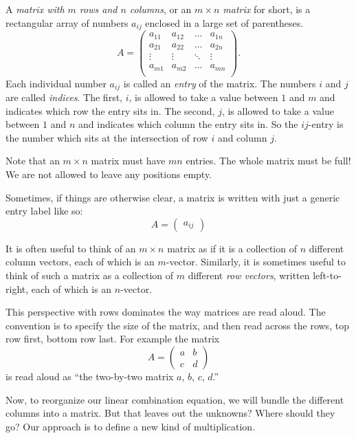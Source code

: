 \documentclass[00-livre-main.tex]{subfiles}
\begin{document}
\begin{definition}
A \emph{matrix with $m$ rows and $n$ columns}, or an \emph{$m\times n$ matrix} for short, is a rectangular array of numbers $a_{ij}$ enclosed in a large set of parentheses. \[
A = \begin{pmatrix}
a_{11} & a_{12} & \dots & a_{1n}\\
a_{21} & a_{22} & \dots & a_{2n}\\
\vdots & \vdots & \ddots & \vdots \\
a_{m1} & a_{m2} & \dots & a_{mn}\\
\end{pmatrix} .
\]
Each individual number $a_{ij}$ is called an \emph{entry} of the matrix. The numbers $i$ and $j$ are called \emph{indices}. The first, $i$, is allowed to take a value between $1$ and $m$ and indicates which row the entry sits in. The second, $j$, is allowed to take a value between $1$ and $n$ and indicates which column the entry sits in. So the $ij$-entry is the number which sits at the intersection of row $i$ and column $j$.


Note that an $m\times n$ matrix must have $mn$ entries. The whole matrix must be full! We are not allowed to leave any positions empty.

Sometimes, if things are otherwise clear, a matrix is written with just a generic entry label like so:
\[
A = \begin{pmatrix} a_{ij} \end{pmatrix}
\]
\end{definition}

It is often useful to think of an $m\times n$ matrix as if it is a collection of $n$ different column vectors, each of which is an $m$-vector. Similarly, it is sometimes useful to think of such a matrix as a collection of $m$ different \emph{row vectors}, written left-to-right, each of which is an $n$-vector.

This perspective with rows dominates the way matrices are read aloud. The convention is to specify the size of the matrix, and then read across the rows, top row first, bottom row last. For example the matrix
\[
A = \begin{pmatrix} a & b \\ c & d \end{pmatrix}
\]
is read aloud as ``the two-by-two matrix $a$, $b$, $c$, $d$.''

Now, to reorganize our linear combination equation, we will bundle the different columns
into a matrix. But that leaves out the unknowns? Where should they go? Our approach is to define a new kind of multiplication. 
\end{document}
